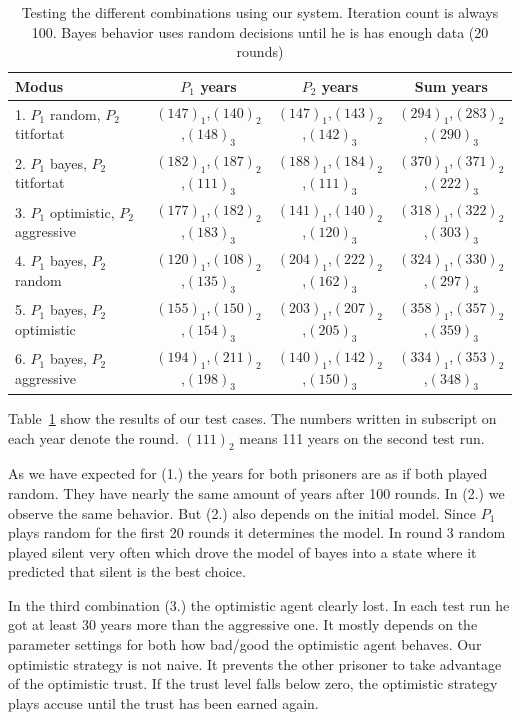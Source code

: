 \documentclass{acm_proc_article-sp}
\begin{document}
\begin{table}
\centering
\begin{tabular}{ l | c | c | c }
Modus & $P_1$ years & $P_2$ years & Sum years \\
\hline
1. $P_1$ random, $P_2$ titfortat & 
   $(147)_1$,$(140)_2$,$(148)_3$ &
   $(147)_1$,$(143)_2$,$(142)_3$ &
   $(294)_1$,$(283)_2$,$(290)_3$ \\
\hline
2. $P_1$ bayes, $P_2$ titfortat &
   $(182)_1$,$(187)_2$,$(111)_3$ &
   $(188)_1$,$(184)_2$,$(111)_3$ &
   $(370)_1$,$(371)_2$,$(222)_3$ \\
   
\hline
3. $P_1$ optimistic, $P_2$ aggressive & 
   $(177)_1$,$(182)_2$,$(183)_3$ &
   $(141)_1$,$(140)_2$,$(120)_3$ &
   $(318)_1$,$(322)_2$,$(303)_3$ \\
\hline
4. $P_1$ bayes, $P_2$ random & 
   $(120)_1$,$(108)_2$,$(135)_3$ &
   $(204)_1$,$(222)_2$,$(162)_3$ &
   $(324)_1$,$(330)_2$,$(297)_3$ \\
   
\hline
5. $P_1$ bayes, $P_2$ optimistic & 
   $(155)_1$,$(150)_2$,$(154)_3$ &
   $(203)_1$,$(207)_2$,$(205)_3$ &
   $(358)_1$,$(357)_2$,$(359)_3$ \\
   
\hline
6. $P_1$ bayes, $P_2$ aggressive & 
   $(194)_1$,$(211)_2$,$(198)_3$ &
   $(140)_1$,$(142)_2$,$(150)_3$ &
   $(334)_1$,$(353)_2$,$(348)_3$ \\
   
\end{tabular}
\caption{Testing the different combinations using our system. Iteration count is always 100. Bayes behavior uses random decisions until he is has enough data (20 rounds)}
\label{tab:tests}
\end{table}

Table~\ref{tab:tests} show the results of our test cases. The numbers written in subscript on each year denote the round. $(111)_2$ means 111 years on the second test run.

As we have expected for (1.) the years for both prisoners are as if both played random. They
have nearly the same amount of years after 100 rounds. In (2.) we observe the same behavior. But (2.) also depends on the initial model. Since $P_1$ plays random for the first 20 rounds
it determines the model. In round 3 random played silent very often which drove the model
of bayes into a state where it predicted that silent is the best choice.

In the third combination (3.) the optimistic agent clearly lost. In each test run he got at least 30 years more than the aggressive one. It mostly depends on the parameter settings for both how bad/good the optimistic agent behaves.
Our optimistic strategy is not naive. It prevents the other prisoner to take advantage of the optimistic trust. If the trust level falls
below zero, the optimistic strategy plays accuse until the trust has been earned again.
\end{document}
